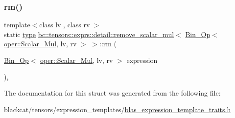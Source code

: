 \subsubsection{\texorpdfstring{rm()}{rm()}}
{\footnotesize\ttfamily template$<$class lv , class rv $>$ \\
static \hyperlink{structbc_1_1tensors_1_1exprs_1_1detail_1_1remove__scalar__mul_3_01Bin__Op_3_01oper_1_1Scalar__Mul_00_01lv_00_01rv_01_4_01_4_ae82759eac7760c962640683384337bc1}{type} \hyperlink{structbc_1_1tensors_1_1exprs_1_1detail_1_1remove__scalar__mul}{bc\+::tensors\+::exprs\+::detail\+::remove\+\_\+scalar\+\_\+mul}$<$ \hyperlink{structbc_1_1tensors_1_1exprs_1_1Bin__Op}{Bin\+\_\+\+Op}$<$ \hyperlink{structbc_1_1oper_1_1Scalar__Mul}{oper\+::\+Scalar\+\_\+\+Mul}, lv, rv $>$ $>$\+::rm (\begin{DoxyParamCaption}\item[{\hyperlink{structbc_1_1tensors_1_1exprs_1_1Bin__Op}{Bin\+\_\+\+Op}$<$ \hyperlink{structbc_1_1oper_1_1Scalar__Mul}{oper\+::\+Scalar\+\_\+\+Mul}, lv, rv $>$}]{expression }\end{DoxyParamCaption})\hspace{0.3cm}{\ttfamily [inline]}, {\ttfamily [static]}}



The documentation for this struct was generated from the following file\+:\begin{DoxyCompactItemize}
\item 
blackcat/tensors/expression\+\_\+templates/\hyperlink{blas__expression__template__traits_8h}{blas\+\_\+expression\+\_\+template\+\_\+traits.\+h}\end{DoxyCompactItemize}
